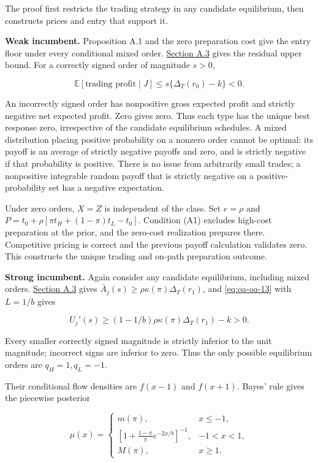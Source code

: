 \documentclass[
  11pt,
]{article}
\begin{document}
The proof first restricts the trading strategy in any candidate
equilibrium, then constructs prices and entry that support it.

\textbf{Weak incumbent.} Proposition A.1 and the zero preparation cost give the entry floor
under every conditional mixed order. \hyperref[oa-a-inference]{Section
A.3} gives the residual upper bound. For a correctly signed order of
magnitude \(s>0\),

\[
\mathbb E[\text{trading profit}\mid J]\le s\{\Delta_T(r_0)-k\}<0.
\tag{OA.14}\label{eq:oa-oa-14}
\]

An incorrectly signed order has nonpositive gross expected profit and strictly negative net expected profit.
Zero gives zero. Thus each type has the unique best response zero,
irrespective of the candidate equilibrium schedules. A mixed
distribution placing positive probability on a nonzero order cannot be
optimal: its payoff is an average of strictly negative payoffs and zero,
and is strictly negative if that probability is positive. There is no
issue from arbitrarily small trades; a nonpositive integrable random
payoff that is strictly negative on a positive-probability set has a
negative expectation.

Under zero orders, \(X=Z\) is independent of the class. Set \(e=\rho\) and
\(P=t_0+\rho[\pi t_H+(1-\pi)t_L-t_0]\). Condition (A1) excludes high-cost
preparation at the prior, and the zero-cost realization prepares there.
Competitive pricing is correct and the previous payoff calculation
validates zero. This constructs the unique trading and on-path
preparation outcome.

\textbf{Strong incumbent.} Again consider any candidate equilibrium,
including mixed orders. \hyperref[oa-a-inference]{Section A.3} gives
\(\bar A_j(s)\ge\rho\kappa(\pi)\Delta_T(r_1)\), and \eqref{eq:oa-oa-13} with
\(L=1/b\) gives

\[
U_j'(s)\ge(1-1/b)\rho\kappa(\pi)\Delta_T(r_1)-k>0.
\tag{OA.15}\label{eq:oa-oa-15}
\]

Every smaller correctly signed magnitude is strictly inferior to the
unit magnitude; incorrect signs are inferior to zero. Thus the only
possible equilibrium orders are \(q_H=1,q_L=-1\).

Their conditional flow densities are \(f(x-1)\) and \(f(x+1)\). Bayes'
rule gives the piecewise posterior

\[
\mu(x)=
\begin{cases}
m(\pi),&x\le-1,\\
\left[1+\frac{1-\pi}{\pi}e^{-2x/b}\right]^{-1},&-1<x<1,\\
M(\pi),&x\ge1.
\end{cases}
\tag{OA.16}\label{eq:oa-oa-16}
\]
\end{document}
